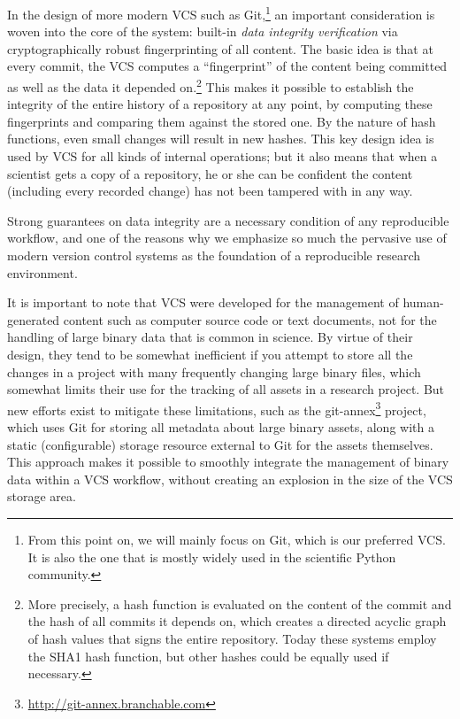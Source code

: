 \documentclass[ChapterTOCs,krantz2]{krantz} %
\begin{document}
In the design of more modern VCS such as Git,\footnote{From this point on, we
will mainly focus on Git, which is our preferred VCS. It is also the one that
is mostly widely used in the scientific Python community.} an important
consideration is woven into the core of the system: built-in \emph{data
  integrity verification} via cryptographically robust fingerprinting of all
content.  The basic idea is that at every commit, the VCS computes a
``fingerprint'' of the content being committed as well as the data it depended
on.\footnote{More precisely, a hash function is evaluated on the content of the
  commit and the hash of all commits it depends on, which creates a directed
  acyclic graph of hash values that signs the entire repository.  Today these
  systems employ the SHA1 hash function, but other hashes could be equally used
  if necessary.}  This makes it possible to
establish the integrity of the entire history of a repository at any point, by
computing these fingerprints and comparing them against the stored one.  By the
nature of hash functions, even small changes will result in new hashes.
This key design idea is used by VCS for all kinds of internal
operations; but it also means that when a scientist gets a copy of a
repository, he or she can be confident the content (including every recorded
change) has not been tampered with in any way.

Strong guarantees on data integrity are a necessary condition of any
reproducible workflow, and one of the reasons why we emphasize so much the
pervasive use of modern version control systems as the foundation of a
reproducible research environment.

It is important to note that VCS were developed for the management of
human-generated content such as computer source code or text documents, not for
the handling of large binary data that is common in science.  By virtue of
their design, they tend to be somewhat inefficient if you attempt to store all
the changes in a project with many frequently changing large binary files,
which somewhat limits their use for the tracking of all assets in a research
project.  But new efforts exist to mitigate these limitations, such as the
git-annex\footnote{\url{http://git-annex.branchable.com}} project, which uses
Git for storing all metadata about large binary assets, along with a static
(configurable) storage resource external to Git for the assets themselves.
This approach makes it possible to smoothly integrate the management of binary
data within a VCS workflow, without creating an explosion in the size of the
VCS storage area.
\end{document}
